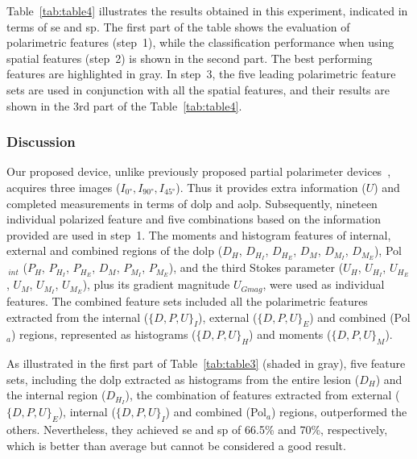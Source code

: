Table~\ref{tab:table4} illustrates the results obtained in this experiment, indicated in terms of \ac{se} and \ac{sp}. 
The first part of the table shows the evaluation of polarimetric features (step~1), while the classification performance when using spatial features (step~2) is shown in the second part.
The best performing features are highlighted in gray.
In step~3, the five leading polarimetric feature sets are used in conjunction with all the spatial features, and their results are shown in the 3rd part of the Table~\ref{tab:table4}.


\subsubsection{Discussion}
Our proposed device, unlike previously proposed partial polarimeter devices~\cite{Jacques12175282,Anastasiadou2008,tchvialeva2013polarization}, acquires three images ($I_{\ang{0}}, I_{\ang{90}}, I_{\ang{45}}$).
Thus it provides extra information ($U$) and completed measurements in terms of \ac{dolp} and \ac{aolp}.
Subsequently, nineteen individual polarized feature and five combinations based on the information provided are used in step~1.
The moments and histogram features of internal, external and combined regions of the \ac{dolp} ($D_{H}$, $D_{H_{I}}$, $D_{H_{E}}$, $D_{M}$, $D_{M_{I}}$, $D_{M_{E}}$), Pol$_{~int}$ ($P_{H}$, $P_{H_{I}}$, $P_{H_{E}}$, $D_{M}$, $P_{M_{I}}$, $P_{M_{E}}$), and the third Stokes parameter ($U_{H}$, $U_{H_{I}}$, $U_{H_{E}}$, $U_{M}$, $U_{M_{I}}$, $U_{M_{E}}$), plus its gradient magnitude $U_{Gmag}$, were used as individual features.
The combined feature sets included all the polarimetric features extracted from the internal ($\{D,P,U\}_{I}$), external ($\{D,P,U\}_{E}$) and combined (Pol$_{a}$) regions, represented as histograms ($\{D,P,U\}_{H}$) and moments ($\{D,P,U\}_{M}$).

As illustrated in the first part of Table~\ref{tab:table3} (shaded in gray), five feature sets, including the \ac{dolp} extracted as histograms from the entire lesion ($D_{H}$) and the internal region ($D_{H_{I}}$), the combination of features extracted from external ($\{D,P,U\}_{E}$), internal ($\{D,P,U\}_{I}$) and combined (Pol$_{a}$) regions, outperformed the others. 
Nevertheless, they achieved \ac{se} and \ac{sp} of 66.5\% and 70\%, respectively, which is better than average but cannot be considered a good result.

